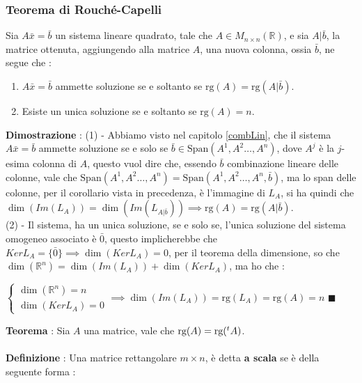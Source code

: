 \documentclass[12pt, letterpaper]{article}
\newcommand{\R}{{\mathbb R}}
\newcommand{\rg}{{\text{rg}}}
\newcommand{\acc}{\\\hphantom{}\\}
\newcommand{\Span}{{\text{Span}}}
\begin{document}
\subsubsection{Teorema di Rouché-Capelli}
Sia \(A\bar x=\bar b\) un sistema lineare quadrato, tale che \(A\in M_{n\times n}(\R)\), e sia \(A|\bar b\), la matrice 
ottenuta, aggiungendo alla matrice \(A\), una nuova colonna, ossia \(\bar b\), ne segue che :\begin{enumerate}
    \item \(A\bar x=\bar b\) ammette soluzione se e soltanto se \(\rg(A)=\rg(A|\bar b)\).
    \item Esiste un unica soluzione se e soltanto se \(\rg(A)=n\).
\end{enumerate}
\textbf{Dimostrazione} : (1) - Abbiamo visto nel capitolo \ref{combLin}, che il sistema \(A\bar x=\bar b\) ammette 
soluzione se e solo se \(\bar b \in \Span(A^1,A^2\dots, A^n)\), dove \(A^j\) è la \(j\)-esima colonna di \(A\), questo vuol dire 
che, essendo \(\bar b\) combinazione lineare delle colonne, vale che \(\Span(A^1,A^2\dots, A^n)=\Span(A^1,A^2\dots, A^n,\bar b)\), ma 
lo span delle colonne, per il corollario vista in precedenza, è l'immagine di \(L_A\), si ha quindi che 
\(\dim(Im(L_A))=\dim(Im(L_{A|\bar b}))\implies \rg(A)=\rg(A|\bar b)\).\\ 
(2) - Il sistema, ha un unica soluzione, se e solo se, l'unica soluzione del sistema omogeneo associato è \(\bar 0\), 
questo implicherebbe che \(KerL_A=\{\bar 0\}\implies \dim(KerL_A)=0\), per il teorema della dimensione, so che 
\(\dim(\R^n)=\dim(Im(L_A))+\dim(KerL_A)\), ma ho che :\begin{center}\(
    \begin{cases}
        \dim(\R^n)=n\\\dim(KerL_A)=0
    \end{cases}\implies \dim(Im(L_A))=\rg(L_A)=\rg(A)=n
\)\hphantom{text} \(\blacksquare\)\end{center} 
\textbf{Teorema }: Sia \(A\) una matrice, vale che \(\rg(A)=\rg(\text{\hphantom{}}^tA)\).\acc 
\textbf{Definizione }: Una matrice rettangolare \(m\times n\), è detta \textbf{a scala} se è della 
seguente forma :  \begin{figure}[h]
    \end{figure}\\
\end{document}
